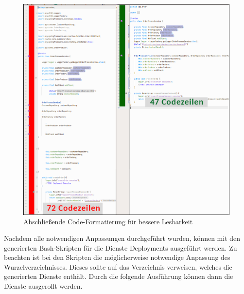 \begin{figure}[ht]
\centering
\includegraphics[width=\textwidth]{bilder/k7/3.png}
\caption{Abschließende Code-Formatierung für bessere Lesbarkeit}
\end{figure}

\newpage

Nachdem alle notwendigen Anpassungen durchgeführt wurden, können mit den generierten Bash-Skripten für die Dienste Deployments ausgeführt werden. Zu beachten ist bei den Skripten die möglicherweise notwendige Anpassung des Wurzelverzeichnisses. Dieses sollte auf das Verzeichnis verweisen, welches die generierten Dienste enthält. Durch die folgende Ausführung können dann die Dienste ausgerollt werden.

